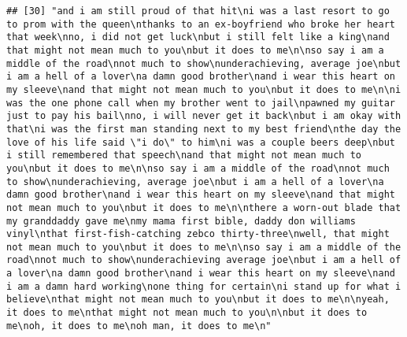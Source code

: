\documentclass[]{article}
\begin{document}
\begin{verbatim}
## [30] "and i am still proud of that hit\ni was a last resort to go to prom with the queen\nthanks to an ex-boyfriend who broke her heart that week\nno, i did not get luck\nbut i still felt like a king\nand that might not mean much to you\nbut it does to me\n\nso say i am a middle of the road\nnot much to show\nunderachieving, average joe\nbut i am a hell of a lover\na damn good brother\nand i wear this heart on my sleeve\nand that might not mean much to you\nbut it does to me\n\ni was the one phone call when my brother went to jail\npawned my guitar just to pay his bail\nno, i will never get it back\nbut i am okay with that\ni was the first man standing next to my best friend\nthe day the love of his life said \"i do\" to him\ni was a couple beers deep\nbut i still remembered that speech\nand that might not mean much to you\nbut it does to me\n\nso say i am a middle of the road\nnot much to show\nunderachieving, average joe\nbut i am a hell of a lover\na damn good brother\nand i wear this heart on my sleeve\nand that might not mean much to you\nbut it does to me\n\nthere a worn-out blade that my granddaddy gave me\nmy mama first bible, daddy don williams vinyl\nthat first-fish-catching zebco thirty-three\nwell, that might not mean much to you\nbut it does to me\n\nso say i am a middle of the road\nnot much to show\nunderachieving average joe\nbut i am a hell of a lover\na damn good brother\nand i wear this heart on my sleeve\nand i am a damn hard working\none thing for certain\ni stand up for what i believe\nthat might not mean much to you\nbut it does to me\n\nyeah, it does to me\nthat might not mean much to you\n\nbut it does to me\noh, it does to me\noh man, it does to me\n"                                                                                                                                                                                                                                                                                                                                                                                                                                                                                                                                                                                                                                                                                                                                                                                                                                                                                                                                                                                                                                                                                                                                                                                                               

\end{verbatim}
\end{document}
